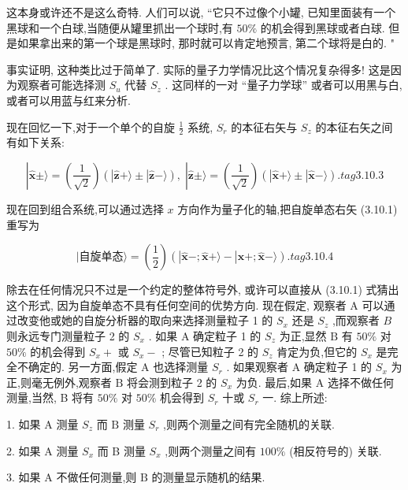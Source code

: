 这本身或许还不是这么奇特. 人们可以说, “它只不过像个小罐, 已知里面装有一个黑球和一个白球,当随便从罐里抓出一个球时,有 ${50}\%$ 的机会得到黑球或者白球. 但是如果拿出来的第一个球是黑球时, 那时就可以肯定地预言, 第二个球将是白的. "

事实证明, 这种类比过于简单了. 实际的量子力学情况比这个情况复杂得多! 这是因为观察者可能选择测 ${S}_{u}$ 代替 ${S}_{z}$ . 这同样的一对 “量子力学球” 或者可以用黑与白,或者可以用蓝与红来分析.

现在回忆一下,对于一个单个的自旋 $\frac{1}{2}$ 系统, ${S}_{r}$ 的本征右矢与 ${S}_{z}$ 的本征右矢之间有如下关系:

$$
\left| {\widehat{\mathbf{x}} \pm \rangle = \left( \frac{1}{\sqrt{2}}\right) \left( {\left| {\widehat{\mathbf{z}} + \rangle \pm }\right| \widehat{\mathbf{z}} - \rangle }\right) ,\;}\right| \widehat{\mathbf{z}} \pm \rangle = \left( \frac{1}{\sqrt{2}}\right) \left( {\left| {\widehat{\mathbf{x}} + \rangle \pm }\right| \widehat{\mathbf{x}} - \rangle }\right) . tag{3.10.3}
$$

现在回到组合系统,可以通过选择 $x$ 方向作为量子化的轴,把自旋单态右矢 (3.10.1) 重写为

$$
|\text{自旋单态}\rangle = \left( \frac{1}{2}\right) \left( {\left| {\widehat{\mathbf{x}} - ;\widehat{\mathbf{x}} + \rangle - }\right| \widehat{\mathbf{x}}+;\widehat{\mathbf{x}} - \rangle }\right) \text{.} tag{3.10.4}
$$

除去在任何情况只不过是一个约定的整体符号外, 或许可以直接从 (3.10.1) 式猜出这个形式, 因为自旋单态不具有任何空间的优势方向. 现在假定, 观察者 $\mathrm{A}$ 可以通过改变他或她的自旋分析器的取向来选择测量粒子 1 的 ${S}_{x}$ 还是 ${S}_{z}$ ,而观察者 $B$ 则永远专门测量粒子 2 的 ${S}_{x}$ . 如果 $\mathrm{A}$ 确定粒子 1 的 ${S}_{z}$ 为正,显然 $\mathrm{B}$ 有 ${50}\%$ 对 ${50}\%$ 的机会得到 ${S}_{x} +$ 或 ${S}_{x} -$ ; 尽管已知粒子 2 的 ${S}_{z}$ 肯定为负,但它的 ${S}_{x}$ 是完全不确定的. 另一方面,假定 $\mathrm{A}$ 也选择测量 ${S}_{r}$ . 如果观察者 $\mathrm{A}$ 确定粒子 1 的 ${S}_{x}$ 为正,则毫无例外,观察者 $\mathrm{B}$ 将会测到粒子 2 的 ${S}_{x}$ 为负. 最后,如果 A 选择不做任何测量,当然, B 将有 ${50}\%$ 对 ${50}\%$ 机会得到 ${S}_{r}$ 十或 ${S}_{r}$ 一. 综上所述:

1. 如果 $\mathrm{A}$ 测量 ${S}_{z}$ 而 $\mathrm{B}$ 测量 ${S}_{r}$ ,则两个测量之间有完全随机的关联.

2. 如果 A 测量 ${S}_{x}$ 而 B 测量 ${S}_{x}$ ,则两个测量之间有 ${100}\%$ (相反符号的) 关联.

3. 如果 $\mathrm{A}$ 不做任何测量,则 $\mathrm{B}$ 的测量显示随机的结果.

